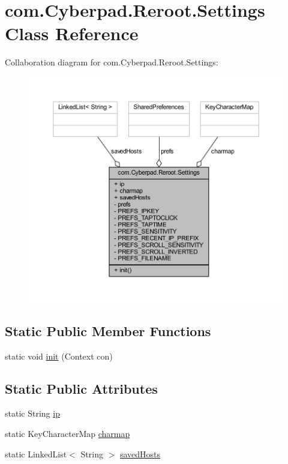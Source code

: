 \hypertarget{classcom_1_1_cyberpad_1_1_reroot_1_1_settings}{
\section{com.\-Cyberpad.\-Reroot.\-Settings \-Class \-Reference}
\label{classcom_1_1_cyberpad_1_1_reroot_1_1_settings}
}


\-Collaboration diagram for com.\-Cyberpad.\-Reroot.\-Settings\-:\nopagebreak
\begin{figure}[H]
\begin{center}
\leavevmode
\includegraphics[width=350pt]{classcom_1_1_cyberpad_1_1_reroot_1_1_settings__coll__graph}
\end{center}
\end{figure}
\subsection*{\-Static \-Public \-Member \-Functions}
\begin{DoxyCompactItemize}
\item 
static void \hyperlink{classcom_1_1_cyberpad_1_1_reroot_1_1_settings_aa1b972fd0715645136a394e2dc2b5518}{init} (\-Context con)
\end{DoxyCompactItemize}
\subsection*{\-Static \-Public \-Attributes}
\begin{DoxyCompactItemize}
\item 
static \-String \hyperlink{classcom_1_1_cyberpad_1_1_reroot_1_1_settings_ab0bac42aaa04dcb632eae42bef9f84cc}{ip}
\item 
static \-Key\-Character\-Map \hyperlink{classcom_1_1_cyberpad_1_1_reroot_1_1_settings_a47ef14787b76da9f78c13138328e6054}{charmap}
\item 
static \-Linked\-List$<$ \-String $>$ \hyperlink{classcom_1_1_cyberpad_1_1_reroot_1_1_settings_a39d6b93260518fa9a44568c5062c7214}{saved\-Hosts}
\end{DoxyCompactItemize}
